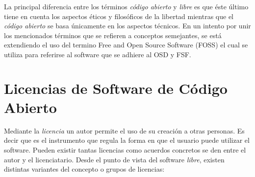 La principal diferencia entre los términos \textit{código abierto} y
\textit{libre} es que éste último tiene en cuenta los aspectos éticos
y filosóficos de la libertad mientras que el \textit{código abierto}
se basa únicamente en los aspectos técnicos. En un intento por unir
los mencionados términos que se refieren a conceptos semejantes, se
está extendiendo el uso del termino Free and Open Source Software
(FOSS) el cual se utiliza para referirse al software que se adhiere al
OSD y FSF.


\section{Licencias de Software de Código Abierto}

Mediante la \textit{licencia} un autor permite el uso de su creación a
otras personas. Es decir que es el instrumento que regula la forma en
que el usuario puede utilizar el software. Pueden existir tantas
licencias como acuerdos concretos se den entre el autor y el
licenciatario. Desde el punto de vista del software \textit{libre},
existen distintas variantes del concepto o grupos de licencias:

